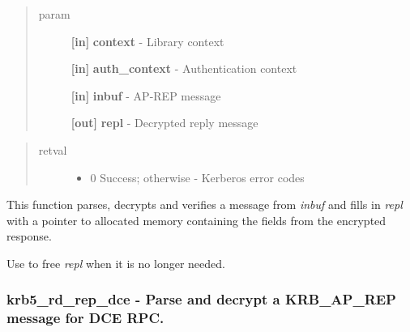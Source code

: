 \documentclass[letterpaper,10pt,english]{sphinxmanual}
\begin{document}
\begin{quote}\begin{description}
\item[{param}] \leavevmode
\textbf{{[}in{]}} \textbf{context} - Library context

\textbf{{[}in{]}} \textbf{auth\_context} - Authentication context

\textbf{{[}in{]}} \textbf{inbuf} - AP-REP message

\textbf{{[}out{]}} \textbf{repl} - Decrypted reply message

\end{description}\end{quote}
\begin{quote}\begin{description}
\item[{retval}] \leavevmode\begin{itemize}
\item {} 
0   Success; otherwise - Kerberos error codes

\end{itemize}

\end{description}\end{quote}

This function parses, decrypts and verifies a message from \emph{inbuf} and fills in \emph{repl} with a pointer to allocated memory containing the fields from the encrypted response.

Use {\hyperref[appdev/refs/api/krb5_free_ap_rep_enc_part:c.krb5_free_ap_rep_enc_part]{}} to free \emph{repl} when it is no longer needed.


\subsubsection{krb5\_rd\_rep\_dce -  Parse and decrypt a KRB\_AP\_REP message for DCE RPC.}
\label{appdev/refs/api/krb5_rd_rep_dce::doc}\label{appdev/refs/api/krb5_rd_rep_dce:krb5-rd-rep-dce-parse-and-decrypt-a-krb-ap-rep-message-for-dce-rpc}

\begin{fulllineitems}
\label{appdev/refs/api/krb5_rd_rep_dce:c.krb5_rd_rep_dce}
\end{fulllineitems}
\end{document}
